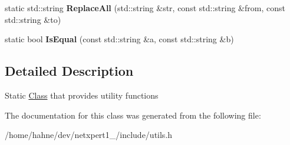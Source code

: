 \begin{DoxyCompactItemize}
\item 
static std\+::string {\bfseries Replace\+All} (std\+::string \&str, const std\+::string \&from, const std\+::string \&to)\hypertarget{classnetxpert_1_1utils_1_1UTILS_ad13853eb638c1d33afbb7bcfee7a857b}{}\label{classnetxpert_1_1utils_1_1UTILS_ad13853eb638c1d33afbb7bcfee7a857b}

\item 
static bool {\bfseries Is\+Equal} (const std\+::string \&a, const std\+::string \&b)\hypertarget{classnetxpert_1_1utils_1_1UTILS_a72a08ffc285bfbccdcbb182b48ebb4f4}{}\label{classnetxpert_1_1utils_1_1UTILS_a72a08ffc285bfbccdcbb182b48ebb4f4}

\end{DoxyCompactItemize}


\subsection{Detailed Description}
Static \hyperlink{classClass}{Class} that provides utility functions 

The documentation for this class was generated from the following file\+:\begin{DoxyCompactItemize}
\item 
/home/hahne/dev/netxpert1\+\_/include/utils.\+h\end{DoxyCompactItemize}
